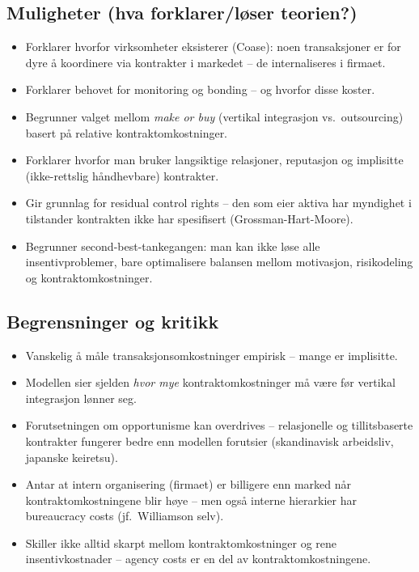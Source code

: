 \subsection*{Muligheter (hva forklarer/løser teorien?)}
\begin{itemize}
\item Forklarer hvorfor virksomheter eksisterer (Coase): noen transaksjoner er for dyre å koordinere via kontrakter i markedet -- de internaliseres i firmaet.
\item Forklarer behovet for monitoring og bonding -- og hvorfor disse koster.
\item Begrunner valget mellom \emph{make or buy} (vertikal integrasjon vs.\ outsourcing) basert på relative kontraktomkostninger.
\item Forklarer hvorfor man bruker langsiktige relasjoner, reputasjon og implisitte (ikke-rettslig håndhevbare) kontrakter.
\item Gir grunnlag for residual control rights -- den som eier aktiva har myndighet i tilstander kontrakten ikke har spesifisert (Grossman-Hart-Moore).
\item Begrunner second-best-tankegangen: man kan ikke løse alle insentivproblemer, bare optimalisere balansen mellom motivasjon, risikodeling og kontraktomkostninger.
\end{itemize}

\subsection*{Begrensninger og kritikk}
\begin{itemize}
\item Vanskelig å måle transaksjonsomkostninger empirisk -- mange er implisitte.
\item Modellen sier sjelden \emph{hvor mye} kontraktomkostninger må være før vertikal integrasjon lønner seg.
\item Forutsetningen om opportunisme kan overdrives -- relasjonelle og tillitsbaserte kontrakter fungerer bedre enn modellen forutsier (skandinavisk arbeidsliv, japanske keiretsu).
\item Antar at intern organisering (firmaet) er billigere enn marked når kontraktomkostningene blir høye -- men også interne hierarkier har bureaucracy costs (jf.\ Williamson selv).
\item Skiller ikke alltid skarpt mellom kontraktomkostninger og rene insentivkostnader -- agency costs er en del av kontraktomkostningene.
\end{itemize}

